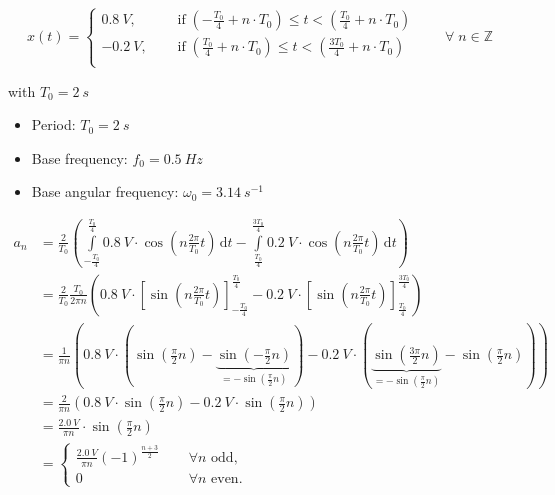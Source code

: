 \begin{solution}
	\begin{tasks}
		\task
		\begin{equation*}
			x(t) = \begin{cases}
				\SI{0.8}{V}, &\quad \text{ if} \; \left(-\frac{T_0}{4} + n \cdot T_0\right) \leq t < \left(\frac{T_0}{4} + n \cdot T_0\right) \\
				\SI{-0.2}{V}, &\quad \text{ if} \; \left(\frac{T_0}{4} + n \cdot T_0\right) \leq t < \left(\frac{3T_0}{4} + n \cdot T_0\right) \\
			\end{cases} \qquad \forall \; n \in \mathbb{Z}
		\end{equation*}
		
		with $T_0 = \SI{2}{s}$
		
		\task
		\begin{itemize}
			\item Period: $T_0 = \SI{2}{s}$
			\item Base frequency: $f_0 = \SI{0,5}{Hz}$
			\item Base angular frequency: $\omega_0 = \SI{3.14}{s^{-1}}$
		\end{itemize}
	
		\task
		\begin{equation*}
			\begin{split}
				a_n &= \frac{2}{T_0} \left( \int\limits_{-\frac{T_0}{4}}^{\frac{T_0}{4}} \SI{0.8}{V} \cdot \cos\left(n\frac{2\pi}{T_0}t\right) \, \mathrm{d} t - \int\limits_{\frac{T_0}{4}}^{\frac{3T_0}{4}} \SI{0.2}{V} \cdot \cos\left(n\frac{2\pi}{T_0}t\right) \, \mathrm{d} t \right) \\
				 &= \frac{2}{T_0} \frac{T_0}{2 \pi n} \left( \SI{0.8}{V} \cdot \left[\sin\left(n\frac{2\pi}{T_0}t\right)\right]_{-\frac{T_0}{4}}^{\frac{T_0}{4}} - \SI{0.2}{V} \cdot \left[\sin\left(n\frac{2\pi}{T_0}t\right)\right]_{\frac{T_0}{4}}^{\frac{3T_0}{4}} \right) \\
				 &= \frac{1}{\pi n} \left(
				 	\SI{0.8}{V} \cdot \left(
				 		\sin\left(\frac{\pi}{2}n\right)
				 		- \underbrace{\sin\left(-\frac{\pi}{2}n\right)}_{= -\sin\left(\frac{\pi}{2}n\right)}
				 	\right)
				 	- \SI{0.2}{V} \cdot \left(
				 		\underbrace{\sin\left(\frac{3\pi}{2}n\right)}_{= -\sin\left(\frac{\pi}{2}n\right)}
				 		- \sin\left(\frac{\pi}{2}n\right)
				 	\right)
				 \right) \\
				 &= \frac{2}{\pi n} \left( \SI{0.8}{V} \cdot \sin\left(\frac{\pi}{2}n\right) - \SI{0.2}{V} \cdot \sin\left(\frac{\pi}{2}n\right) \right) \\
				 &= \frac{\SI{2,0}{V}}{\pi n} \cdot \sin\left(\frac{\pi}{2}n\right) \\
				 &= \begin{cases}
				 	\frac{\SI{2,0}{V}}{\pi n} (-1)^{\frac{n+3}{2}} &\quad \; \forall n \text{ odd}, \\
				 	0 &\quad \; \forall n \text{ even}.
				 \end{cases}
			\end{split}
		\end{equation*}
		

\end{tasks}
\end{solution}

